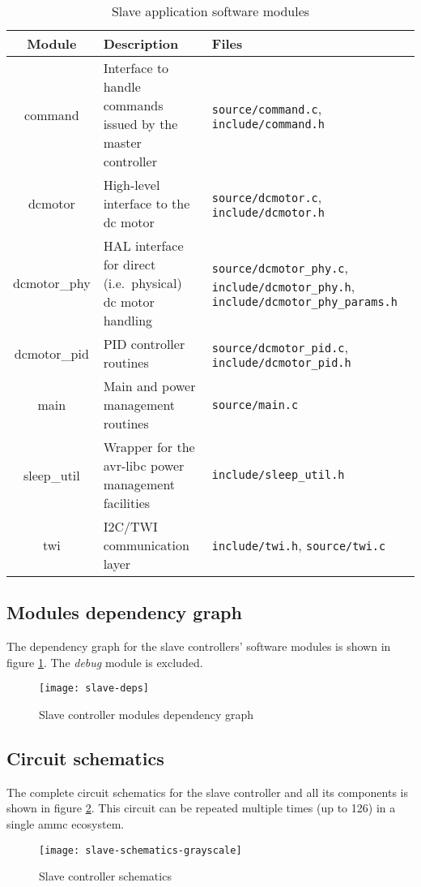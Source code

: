 \begin{table}[ht]
  \begin{tabularx}{\textwidth}{c X X}
    \toprule
    Module & Description & Files \\
    \midrule
    command &
      Interface to handle commands issued by the master controller &
      \texttt{source/command.c},
      \texttt{include/command.h} \\
    dcmotor &
      High-level interface to the dc motor &
      \texttt{source/dcmotor.c},
      \texttt{include/dcmotor.h} \\
    dcmotor\_phy &
      HAL interface for direct (i.e.\ physical) dc motor handling &
      \texttt{source/dcmotor\_phy.c},
      \texttt{include/dcmotor\_phy.h},
      \texttt{include/dcmotor\_phy\_params.h} \\
    dcmotor\_pid &
      PID controller routines &
      \texttt{source/dcmotor\_pid.c},
      \texttt{include/dcmotor\_pid.h} \\
    main &
      Main and power management routines &
      \texttt{source/main.c} \\
    sleep\_util &
      Wrapper for the avr-libc power management facilities &
      \texttt{include/sleep\_util.h} \\
    twi &
      I2C/TWI communication layer &
      \texttt{include/twi.h},
      \texttt{source/twi.c} \\
    \bottomrule
  \end{tabularx}
  \caption{Slave application software modules}
  \label{tab:slave-spec-modules}
\end{table}


\subsection{Modules dependency graph}
The dependency graph for the slave controllers' software modules is shown in
figure \ref{img:slave-deps-graph}. The \emph{debug} module is excluded.
\begin{figure}[ht]
\begin{centering}
  \texttt{[image: slave-deps]}
  \caption{Slave controller modules dependency graph}
  \label{img:slave-deps-graph}
\end{centering}
\end{figure}

\subsection{Circuit schematics}
The complete circuit schematics for the slave controller and all its components
is shown in figure \ref{img:slave-sch}. This circuit can be repeated multiple
times (up to 126) in a single ammc ecosystem.
\begin{figure}[htb]
\begin{centering}
  \texttt{[image: slave-schematics-grayscale]}
  \caption{Slave controller schematics}
  \label{img:slave-sch}
\end{centering}
\end{figure}

